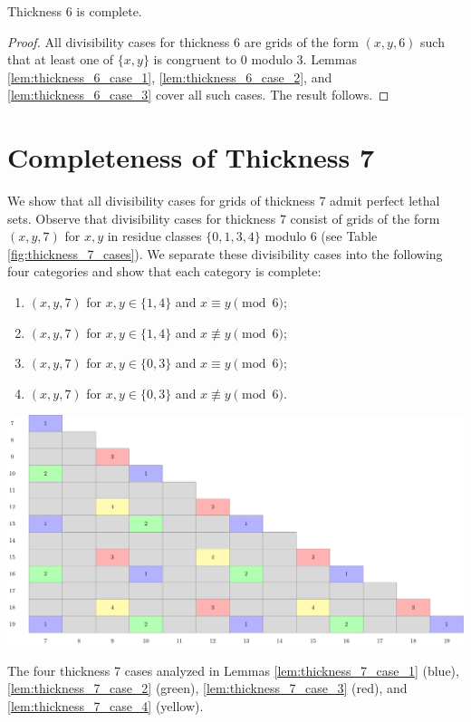 \begin{lem}
Thickness 6 is complete.
\end{lem}

\begin{proof}
All divisibility cases for thickness 6 are grids of the form $(x,y,6)$ such that at least one of $\{x,y\}$ is congruent to 0 modulo 3. Lemmas \ref{lem:thickness_6_case_1}, \ref{lem:thickness_6_case_2}, and \ref{lem:thickness_6_case_3} cover all such cases. The result follows.
\end{proof}

\section{Completeness of Thickness 7}

We show that all divisibility cases for grids of thickness 7 admit perfect lethal sets. Observe that divisibility cases for thickness 7 consist of grids of the form $(x,y,7)$ for $x,y$ in residue classes $\{0,1,3,4\}$ modulo 6 (see Table \ref{fig:thickness_7_cases}). We separate these divisibility cases into the following four categories and show that each category is complete:
\begin{enumerate}
\item $(x,y,7)$ for $x,y \in \{1,4\}$ and $x \equiv y \pmod 6$;
\item $(x,y,7)$ for $x,y \in \{1,4\}$ and $x \not\equiv y \pmod 6$;
\item $(x,y,7)$ for $x,y \in \{0,3\}$ and $x \equiv y \pmod 6$;
\item $(x,y,7)$ for $x,y \in \{0,3\}$ and $x \not\equiv y \pmod 6$.
\end{enumerate}

\begin{table}[]
\centering
\includegraphics[width=\textwidth]{tables/4/thickness_7_cases.pdf}
\caption{The four thickness 7 cases analyzed in Lemmas \ref{lem:thickness_7_case_1} (blue), \ref{lem:thickness_7_case_2} (green), \ref{lem:thickness_7_case_3} (red), and \ref{lem:thickness_7_case_4} (yellow).}
\label{fig:thickness_7_cases}
\end{table}

